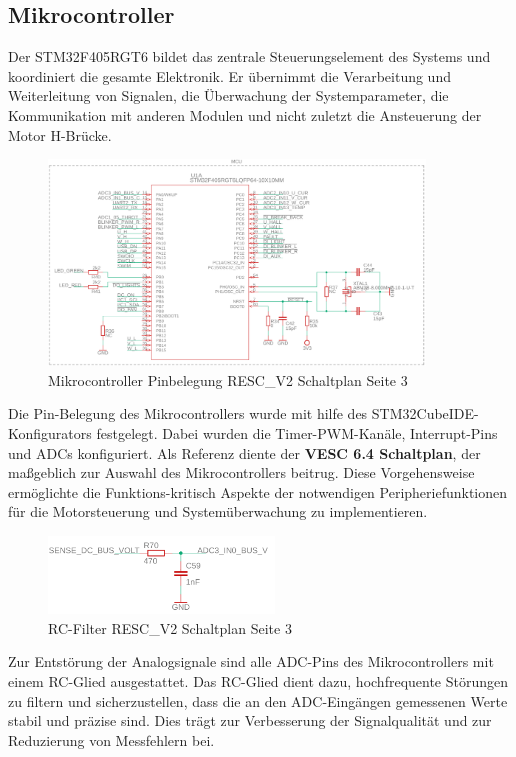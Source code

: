 \documentclass[paper=a4,11pt]{scrreprt}
\begin{document}
\subsection{Mikrocontroller}
Der STM32F405RGT6 bildet das zentrale Steuerungselement des Systems und koordiniert die gesamte Elektronik. Er übernimmt die Verarbeitung und Weiterleitung von Signalen, die Überwachung der Systemparameter, die Kommunikation mit anderen Modulen und nicht zuletzt die Ansteuerung der Motor H-Brücke.

\begin{figure}[ht]
\begin{center}
\includegraphics[width=10cm]{Bilder/Pinning.PNG}
\caption{Mikrocontroller Pinbelegung RESC\_V2 Schaltplan Seite 3}
\label{mcu}
\end{center}
\end{figure}

Die Pin-Belegung des Mikrocontrollers wurde mit hilfe des STM32CubeIDE-Konfigurators festgelegt. Dabei wurden die Timer-PWM-Kanäle, Interrupt-Pins und ADCs konfiguriert.
Als Referenz diente der \textbf{VESC 6.4 Schaltplan}, der maßgeblich zur Auswahl des Mikrocontrollers beitrug. Diese Vorgehensweise ermöglichte die Funktions-kritisch Aspekte der notwendigen Peripheriefunktionen für die Motorsteuerung und Systemüberwachung zu implementieren.

\begin{figure}[ht]
\begin{center}
\includegraphics[width=6cm]{Bilder/ADC.PNG}
\caption{RC-Filter RESC\_V2 Schaltplan Seite 3}
\label{ADC}
\end{center}
\end{figure}

Zur Entstörung der Analogsignale sind alle ADC-Pins des Mikrocontrollers mit einem RC-Glied ausgestattet.
Das RC-Glied dient dazu, hochfrequente Störungen zu filtern und sicherzustellen, dass die an den ADC-Eingängen gemessenen Werte stabil und präzise sind. Dies trägt zur Verbesserung der Signalqualität und zur Reduzierung von Messfehlern bei.
\newpage
\end{document}

